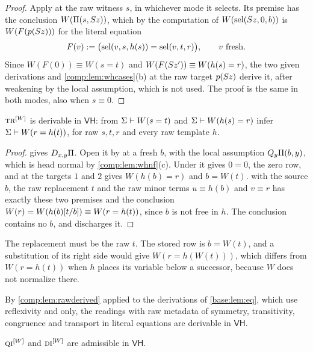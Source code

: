 \begin{proof}
Apply  at the raw witness $s$, in whichever mode it selects.
Its premise has the conclusion $W(\Pi(s,S z))$, which by the computation
of $W(\operatorname{sel}(S z,0,b))$ is $W(F(p(S z)))$ for the literal equation
\[
 F(v)\mathrel{:=}\bigl(\operatorname{sel}(v,s,h(s))=\operatorname{sel}(v,t,r)\bigr),\qquad v\text{ fresh}.
\]
Since $W(F(0))\equiv W(s=t)$ and $W(F(S z'))\equiv W(h(s)=r)$, the two
given derivations and \cref{comp:lem:whcases}(b) at the raw target
$p(S z)$ derive it, after weakening by the local assumption, which is not
used. The proof is the same in both modes, also when $s\equiv0$.
\end{proof}

\begin{lemma}[Transport]
\label{comp:lem:whtr}
$\rulename{Tr}^{[W]}$ is derivable in $\mathsf{VH}$: from
$\Sigma\vdash W(s=t)$ and $\Sigma\vdash W(h(s)=r)$ infer
$\Sigma\vdash W(r=h(t))$, for raw $s,t,r$ and every raw template $h$.
\end{lemma}

\begin{proof}
 gives $D_{x,y}\Pi$. Open it by  at a
fresh $b$, with the local assumption $Q_{y}\Pi(b,y)$, which is head normal
by \cref{comp:lem:whnf}(c). Under it  gives $0=0$, the zero
row, and  at the targets $1$ and $2$ gives $W(h(b)=r)$ and
$b=W(t)$.  with the source $b$, the raw replacement $t$ and
the raw minor terms $u\equiv h(b)$ and $v\equiv r$ has exactly these two
premises and the conclusion $W(r)=W(h(b)[t/b])\equiv W(r=h(t))$,
since $b$ is not free in $h$. The conclusion contains no $b$, and
 discharges it.
\end{proof}

The replacement must be the raw $t$. The stored row is $b=W(t)$, and a
substitution of its right side would give $W(r=h(W(t)))$, which differs from
$W(r=h(t))$ when $h$ places its variable below a successor, because $W$
does not normalize there.

By \cref{comp:lem:rawderived} applied to the derivations of
\cref{base:lem:eq}, which use reflexivity and  only, the
readings with raw metadata of symmetry, transitivity, congruence and
transport in literal equations are derivable in $\mathsf{VH}$.

\begin{lemma}
\label{comp:lem:whintro}
$\rulename{QI}^{[W]}$ and $\rulename{DI}^{[W]}$ are admissible in
$\mathsf{VH}$.
\end{lemma}

